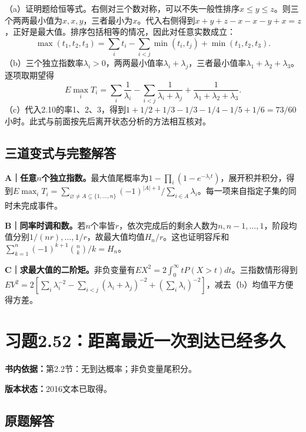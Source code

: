 \documentclass[
  11pt,
  a4paper,
  UTF8,fontset=fandol]{ctexart}
\let\OldSection\section
\renewcommand{\section}{\Needspace{7\baselineskip}\OldSection}
\let\OldSubsection\subsection
\renewcommand{\subsection}{\Needspace{5\baselineskip}\OldSubsection}
\begin{document}
（a）证明题给恒等式。右侧对三个数对称，可以不失一般性排序\(x\le y\le z\)。则三个两两最小值为\(x,x,y\)，三者最小为\(x\)。代入右侧得到\(x+y+z-x-x-y+x=z\)，正好是最大值。排序包括相等的情况，因此对任意实数成立：
\[\max(t_1,t_2,t_3)=\sum_i t_i-\sum_{i<j}\min(t_i,t_j)+\min(t_1,t_2,t_3).\]
（b）三个独立指数率\(\lambda_i>0\)，两两最小值率\(\lambda_i+\lambda_j\)，三者最小值率\(\lambda_1+\lambda_2+\lambda_3\)。逐项取期望得
\[\boxed{E\max_iT_i=\sum_i\frac1{\lambda_i}-\sum_{i<j}\frac1{\lambda_i+\lambda_j}+\frac1{\lambda_1+\lambda_2+\lambda_3}.}\]
（c）代入2.10的率1、2、3，得到\(1+1/2+1/3-1/3-1/4-1/5+1/6=\boxed{73/60}\)小时。此式与前面按先后离开状态分析的方法相互核对。

\subsection{三道变式与完整解答}\label{ux4e09ux9053ux53d8ux5f0fux4e0eux5b8cux6574ux89e3ux7b54-50}

\textbf{A｜任意\(n\)个独立指数。}最大值尾概率为\(1-\prod_i(1-e^{-\lambda_it})\)，展开积并积分，得到\(E\max_iT_i=\sum_{\varnothing\ne A\subseteq\{1,\ldots,n\}}(-1)^{|A|+1}/\sum_{i\in A}\lambda_i\)。每一项来自指定子集的同时未完成事件。

\textbf{B｜同率时调和数。}若\(n\)个率皆\(r\)，依次完成后的剩余人数为\(n,n-1,\ldots,1\)，阶段均值分别\(1/(nr),\ldots,1/r\)，故最大值均值\(H_n/r\)。这也证明容斥和\(\sum_{k=1}^n(-1)^{k+1}\binom nk/k=H_n\)。

\textbf{C｜求最大值的二阶矩。}非负变量有\(EX^2=2\int_0^\infty tP(X>t)dt\)。三指数情形得到\(EV^2=2[\sum_i\lambda_i^{-2}-\sum_{i<j}(\lambda_i+\lambda_j)^{-2}+(\sum_i\lambda_i)^{-2}]\)，减去（b）均值平方便得方差。

\newpage

\section{习题2.52：距离最近一次到达已经多久}\label{ux4e60ux98982.52ux8dddux79bbux6700ux8fd1ux4e00ux6b21ux5230ux8fbeux5df2ux7ecfux591aux4e45}

\textbf{书内依据：}第2.2节：无到达概率；非负变量尾积分。

\textbf{版本状态：}2016文本已取得。

\subsection{原题解答}\label{ux539fux9898ux89e3ux7b54-51}
\end{document}
